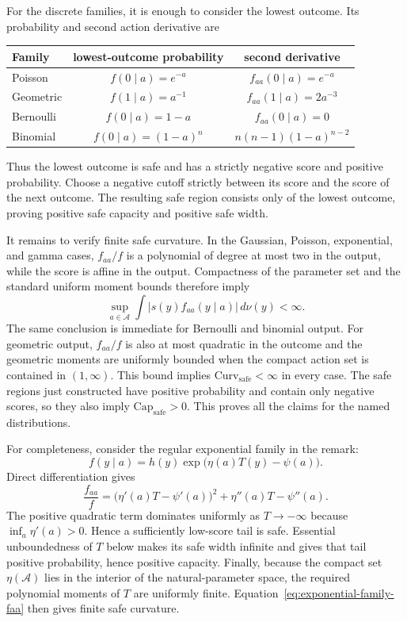 \documentclass[12pt]{article}
\begin{document}
For the discrete families, it is enough to consider the lowest outcome.  Its
probability and second action derivative are
\begin{center}
\begin{tabular}{lcc}
\toprule
Family & lowest-outcome probability & second derivative \\
\midrule
Poisson & $f(0\mid a)=e^{-a}$ & $f_{aa}(0\mid a)=e^{-a}$ \\
Geometric & $f(1\mid a)=a^{-1}$ & $f_{aa}(1\mid a)=2a^{-3}$ \\
Bernoulli & $f(0\mid a)=1-a$ & $f_{aa}(0\mid a)=0$ \\
Binomial & $f(0\mid a)=(1-a)^n$ &
$n(n-1)(1-a)^{n-2}$ \\
\bottomrule
\end{tabular}
\end{center}
Thus the lowest outcome is safe and has a strictly negative score and positive
probability.  Choose a negative cutoff strictly between its score and the
score of the next outcome.  The resulting safe region consists only of the
lowest outcome, proving positive safe capacity and positive safe width.

It remains to verify finite safe curvature.  In the Gaussian, Poisson,
exponential, and gamma cases, $f_{aa}/f$ is a polynomial of degree at most two
in the output, while the score is affine in the output.  Compactness of the
parameter set and the standard uniform moment bounds therefore imply
\[
 \sup_{a\in\mathcal A}\int |s(y)f_{aa}(y\mid a)|\,d\nu(y)<\infty.
\]
The same conclusion is immediate for Bernoulli and binomial output.  For
geometric output, $f_{aa}/f$ is also at most quadratic in the outcome and the
geometric moments are uniformly bounded when the compact action set is
contained in $(1,\infty)$.  This bound implies
$\mathrm{Curv}_{\mathrm{safe}}<\infty$ in every case.  The safe regions just
constructed have positive probability and contain only negative scores, so
they also imply $\mathrm{Cap}_{\mathrm{safe}}>0$.  This proves all the claims
for the named distributions.

For completeness, consider the regular exponential family in the remark:
\[
 f(y\mid a)=h(y)\exp\bigl(\eta(a)T(y)-\psi(a)\bigr).
\]
Direct differentiation gives
\begin{equation}
 \frac{f_{aa}}f
 =\bigl(\eta'(a)T-\psi'(a)\bigr)^2+\eta''(a)T-\psi''(a).
 \label{eq:exponential-family-faa}
\end{equation}
The positive quadratic term dominates uniformly as $T\to-\infty$ because
$\inf_a\eta'(a)>0$.  Hence a sufficiently low-score tail is safe.  Essential
unboundedness of $T$ below makes its safe width infinite and gives that tail
positive probability, hence positive capacity.  Finally, because the compact
set $\eta(\mathcal A)$ lies in the interior of the natural-parameter space,
the required polynomial moments of $T$ are uniformly finite.  Equation~\eqref{eq:exponential-family-faa} then gives finite safe curvature.
\end{document}

